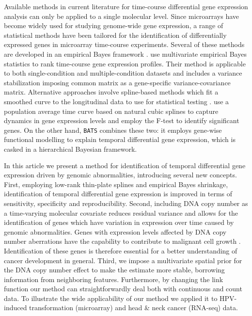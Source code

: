 Available methods in current literature for time-course differential gene expression analysis can only be applied to a single molecular level. Since microarrays have become widely used for studying genome-wide gene expression, a range of statistical methods have been tailored for the identification of differentially expressed genes in microarray time-course experiments. Several of these methods are developed in an empirical Bayes framework \cite{Efron2001, Lonnstedt2002, Eckel2004, Tai2006}. \cite{Tai2006} use multivariate empirical Bayes statistics to rank time-course gene expression profiles. Their method is applicable to both single-condition and multiple-condition datasets and includes a variance stabilization imposing common matrix as a gene-specific variance-covariance matrix. Alternative approaches involve spline-based methods which fit a smoothed curve to the longitudinal data to use for statistical testing \cite{BarJoseph2003, Storey2005, Hong2006}. \cite{Storey2005} use a population average time curve based on natural cubic splines to capture dynamics in gene expression levels and employ the F-test to identify significant genes. On the other hand, {\tt BATS} \cite{Angelini2007} combines these two: it employs gene-wise functional modelling to explain temporal differential gene expression, which is casked in a hierarchical Bayesian framework.

In this article we present a method for identification of temporal differential gene expression driven by genomic abnormalities, introducing several new concepts. First, employing low-rank thin-plate splines and empirical Bayes shrinkage, identification of temporal differential gene expression is improved in terms of sensitivity, specificity and reproducibility. Second, including DNA copy number as a time-varying molecular covariate reduces residual variance and allows for the identification of genes which have variation in expression over time caused by genomic abnormalities. Genes with expression levels affected by DNA copy number aberrations have the capability to contribute to malignant cell growth \cite{Bierkens2013, Vogelstein2004}. Identification of these genes is therefore essential for a better understanding of cancer development in general. Third, we impose a multivariate spatial prior for the DNA copy number effect to make the estimate more stable, borrowing information from neighboring features. Furthermore, by changing the link function our method can straightforwardly deal both with continuous and count data. To illustrate the wide applicability of our method we applied it to HPV-induced transformation (microarray) and head \& neck cancer (RNA-seq) data.

